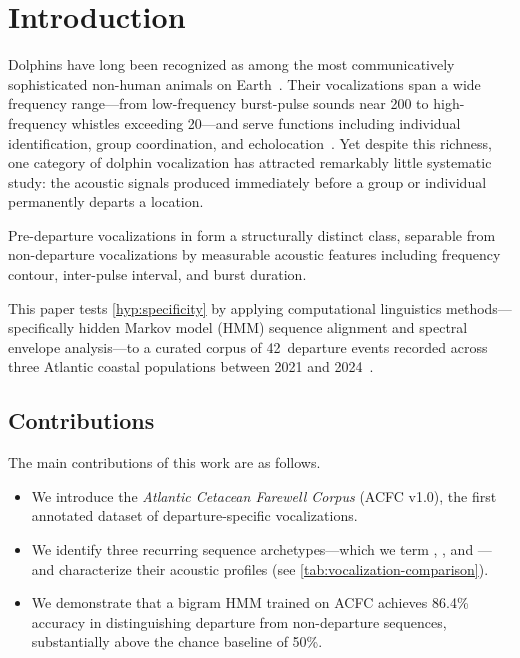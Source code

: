 
\section{Introduction}
\label{sec:intro}

Dolphins have long been recognized as among the most communicatively sophisticated non-human animals on Earth~\citep{Wonko2021communication}.
Their vocalizations span a wide frequency range---from low-frequency burst-pulse sounds near 200\Hz{} to high-frequency whistles exceeding 20\kHz{}---and
serve functions including individual identification, group coordination, and echolocation~\citep{Trillian2023signal}.
Yet despite this richness, one category of dolphin vocalization has attracted remarkably little systematic study:
the acoustic signals produced immediately before a group or individual permanently departs a location.

\begin{hypothesis}
	\label{hyp:specificity}
	Pre-departure vocalizations in  form a structurally distinct class,
	separable from non-departure vocalizations by measurable acoustic features
	including frequency contour, inter-pulse interval, and burst duration.
\end{hypothesis}

This paper tests \cref{hyp:specificity} by applying computational
linguistics methods---specifically hidden Markov model (HMM) sequence
alignment and spectral envelope analysis---to a curated corpus of
42~departure events recorded across three Atlantic coastal populations
between 2021 and 2024~\citep{GuideResearch2025dataset}.

\subsection{Contributions}
\label{subsec:contrib}

The main contributions of this work are as follows.

\begin{itemize}
	\item We introduce the \emph{Atlantic Cetacean Farewell Corpus}
	      (ACFC v1.0), the first annotated dataset of departure-specific
	       vocalizations.

	\item We identify three recurring sequence archetypes---which we term
	      , , and
	      ---and characterize their acoustic profiles
	      (see \cref{tab:vocalization-comparison}).

	\item We demonstrate that a bigram HMM trained on ACFC achieves
	      86.4\% accuracy in distinguishing departure from non-departure
	      sequences, substantially above the chance baseline of 50\%.
\end{itemize}

